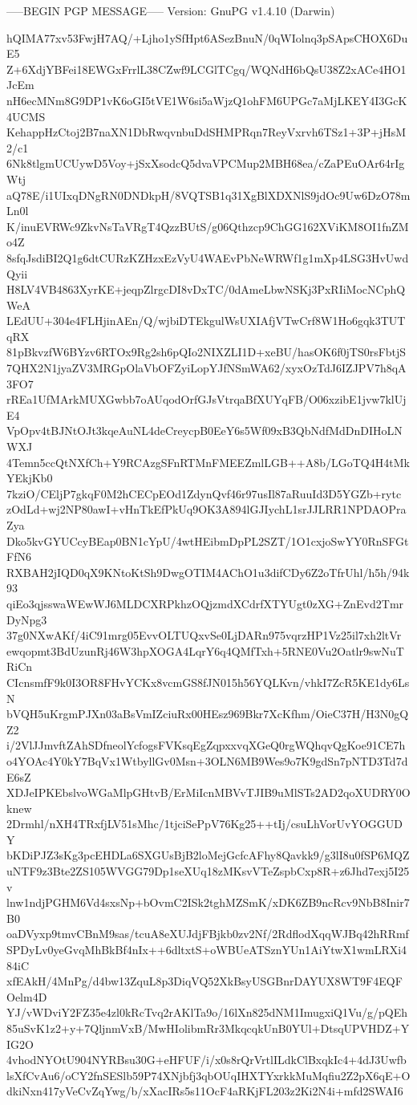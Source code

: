 -----BEGIN PGP MESSAGE-----
Version: GnuPG v1.4.10 (Darwin)

hQIMA77xv53FwjH7AQ/+Ljho1ySfHpt6ASezBnuN/0qWIolnq3pSApsCHOX6DuE5
Z+6XdjYBFei18EWGxFrrlL38CZwf9LCGlTCgq/WQNdH6bQsU38Z2xACe4HO1JcEm
nH6ecMNm8G9DP1vK6oGI5tVE1W6si5aWjzQ1ohFM6UPGc7aMjLKEY4I3GcK4UCMS
KehappHzCtoj2B7naXN1DbRwqvnbuDdSHMPRqn7ReyVxrvh6TSz1+3P+jHsM2/c1
6Nk8tlgmUCUywD5Voy+jSxXsodcQ5dvaVPCMup2MBH68ea/cZaPEuOAr64rIgWtj
aQ78E/i1UIxqDNgRN0DNDkpH/8VQTSB1q31XgBlXDXNlS9jdOc9Uw6DzO78mLn0l
K/inuEVRWc9ZkvNsTaVRgT4QzzBUtS/g06Qthzcp9ChGG162XViKM8OI1fnZMo4Z
8sfqJsdiBI2Q1g6dtCURzKZHzxEzVyU4WAEvPbNeWRWf1g1mXp4LSG3HvUwdQyii
H8LV4VB4863XyrKE+jeqpZlrgcDI8vDxTC/0dAmeLbwNSKj3PxRIiMocNCphQWeA
LEdUU+304e4FLHjinAEn/Q/wjbiDTEkgulWsUXIAfjVTwCrf8W1Ho6gqk3TUTqRX
81pBkvzfW6BYzv6RTOx9Rg2sh6pQIo2NIXZLI1D+xeBU/hasOK6f0jTS0rsFbtjS
7QHX2N1jyaZV3MRGpOlaVbOFZyiLopYJfNSmWA62/xyxOzTdJ6IZJPV7h8qA3FO7
rREa1UfMArkMUXGwbb7oAUqodOrfGJsVtrqaBfXUYqFB/O06xzibE1jvw7klUjE4
VpOpv4tBJNtOJt3kqeAuNL4deCreycpB0EeY6s5Wf09xB3QbNdfMdDnDIHoLNWXJ
4Temn5ccQtNXfCh+Y9RCAzgSFnRTMnFMEEZmlLGB++A8b/LGoTQ4H4tMkYEkjKb0
7kziO/CEljP7gkqF0M2hCECpEOd1ZdynQvf46r97usIl87aRuuId3D5YGZb+rytc
zOdLd+wj2NP80awI+vHnTkEfPkUq9OK3A894lGJIychL1srJJLRR1NPDAOPraZya
Dko5kvGYUCcyBEap0BN1cYpU/4wtHEibmDpPL2SZT/1O1cxjoSwYY0RnSFGtFfN6
RXBAH2jIQD0qX9KNtoKtSh9DwgOTIM4AChO1u3difCDy6Z2oTfrUhl/h5h/94k93
qiEo3qjsswaWEwWJ6MLDCXRPkhzOQjzmdXCdrfXTYUgt0zXG+ZnEvd2TmrDyNpg3
37g0NXwAKf/4iC91mrg05EvvOLTUQxvSe0LjDARn975vqrzHP1Vz25il7xh2ltVr
ewqopmt3BdUzunRj46W3hpXOGA4LqrY6q4QMfTxh+5RNE0Vu2Oatlr9swNuTRiCn
CIcnsmfF9k0I3OR8FHvYCKx8vcmGS8fJN015h56YQLKvn/vhkI7ZcR5KE1dy6LsN
bVQH5uKrgmPJXn03aBsVmIZciuRx00HEsz969Bkr7XcKfhm/OieC37H/H3N0gQZ2
i/2VlJJmvftZAhSDfneolYcfogsFVKsqEgZqpxxvqXGeQ0rgWQhqvQgKoe91CE7h
o4YOAc4Y0kY7BqVx1WtbyllGv0Msn+3OLN6MB9Wes9o7K9gdSn7pNTD3Td7dE6sZ
XDJeIPKEbslvoWGaMlpGHtvB/ErMiIcnMBVvTJIB9uMlSTs2AD2qoXUDRY0Oknew
2Drmhl/nXH4TRxfjLV51sMhc/1tjciSePpV76Kg25++tIj/csuLhVorUvYOGGUDY
bKDiPJZ3sKg3pcEHDLa6SXGUsBjB2loMejGcfcAFhy8Qavkk9/g3lI8u0fSP6MQZ
uNTF9z3Bte2ZS105WVGG79Dp1seXUq18zMKsvVTeZspbCxp8R+z6Jhd7exj5I25v
lnw1ndjPGHM6Vd4sxsNp+bOvmC2ISk2tghMZSmK/xDK6ZB9ncRcv9NbB8Inir7B0
oaDVyxp9tmvCBnM9sas/tcuA8eXUJdjFBjkb0zv2Nf/2RdflodXqqWJBq42hRRmf
SPDyLv0yeGvqMhBkBf4nIx++6dltxtS+oWBUeATSznYUn1AiYtwX1wmLRXi484iC
xfEAkH/4MnPg/d4bw13ZquL8p3DiqVQ52XkBsyUSGBnrDAYUX8WT9F4EQFOelm4D
YJ/vWDviY2FZ35e4zl0kRcTvq2rAKlTa9o/16lXn825dNM1ImugxiQ1Vu/g/pQEh
85uSvK1z2+y+7QljnmVxB/MwHIolibmRr3MkqcqkUnB0YUl+DtsqUPVHDZ+YIG2O
4vhodNYOtU904NYRBsu30G+eHFUF/i/x0s8rQrVrtlILdkClBxqkIc4+4dJ3Uwfb
lsXfCvAu6/oCY2fnSESlb59P74XNjbfj3qbOUqIHXTYxrkkMuMqfiu2Z2pX6qE+O
dkiNxn417yVeCvZqYwg/b/xXacIRs5s11OcF4aRKjFL203z2Ki2N4i+mfd2SWAI6
